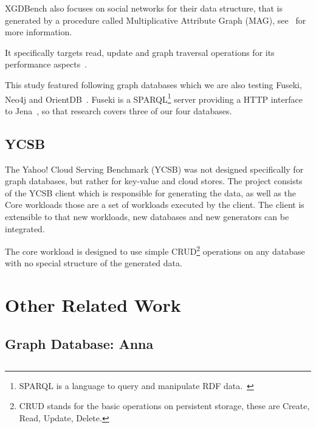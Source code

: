 XGDBench also focuses on social networks for their data structure,
that is generated by a procedure called Multiplicative Attribute Graph (MAG),
see~\cite{Kim2012} for more information.

It specifically targets read,
update and graph traversal operations for its performance aspects~\cite[366]{Dayarathna2012}.

This study featured following graph databases which we are also testing Fuseki, Neo4j and OrientDB~\cite[364]{Dayarathna2012}.
Fuseki is a SPARQL\footnote{SPARQL is a language to query and manipulate RDF data.~\cite{Harris2013}} server providing a HTTP interface to Jena~\cite{Apache2016},
so that research covers three of our four databases.

\subsection{YCSB}
\label{ch:background:se:ycsb}
The Yahoo! Cloud Serving Benchmark (YCSB) was not designed specifically for graph databases,
but rather for key-value and cloud stores.
The project consists of the YCSB client which is responsible for generating the data,
as well as the Core workloads those are a set of workloads executed by the client.
The client is extensible to that new workloads,
new databases and new generators can be integrated.~\cite{Yahoo!2010}

The core workload is designed to use simple CRUD\footnote{CRUD stands for the basic operations on persistent storage, these are Create, Read, Update, Delete.} operations on any database with no special structure of the generated data.


\section{Other Related Work }

\subsection{Graph Database: Anna}

\subsection{}
